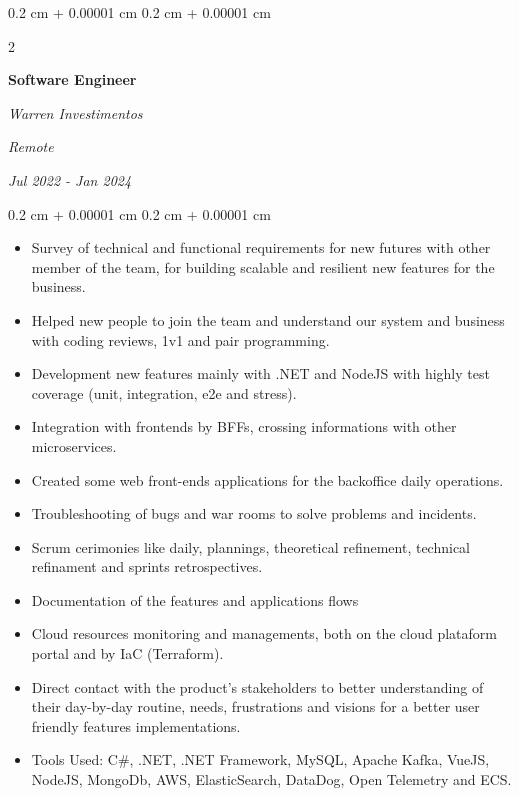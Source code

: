 \documentclass[10pt, letterpaper]{article}
\newenvironment{highlights}{
    \begin{itemize}[
        topsep=0.10 cm,
        parsep=0.10 cm,
        partopsep=0pt,
        itemsep=0pt,
        leftmargin=0.4 cm + 10pt
    ]
}{
    \end{itemize}
} %
\newenvironment{onecolentry}{
    \begin{adjustwidth}{
        0.2 cm + 0.00001 cm
    }{
        0.2 cm + 0.00001 cm
    }
}{
    \end{adjustwidth}
} %
\newenvironment{twocolentry}[2][]{
    \onecolentry
    \def\secondColumn{#2}
    \setcolumnwidth{\fill, 4.5 cm}
    \begin{paracol}{2}
}{
    \switchcolumn \raggedleft \secondColumn
    \end{paracol}
    \endonecolentry
} %
\begin{document}
        \begin{twocolentry}{
        \textit{Remote}    
            
        \textit{Jul 2022 - Jan 2024}}
            \textbf{Software Engineer}
            
            \textit{Warren Investimentos}
        \end{twocolentry}

        \vspace{0.10 cm}
        \begin{onecolentry}
            \begin{highlights}
                \item Survey of technical and functional requirements for new futures with other member of the team, for building scalable and resilient new features for the business.
                \item  Helped new people to join the team and understand our system and business with coding reviews, 1v1 and pair programming.
                \item Development new features mainly with .NET and NodeJS with highly test coverage (unit, integration, e2e and stress).
                \item Integration with frontends by BFFs, crossing informations with other microservices.
                \item Created some web front-ends applications for the backoffice daily operations.
                \item Troubleshooting of bugs and war rooms to solve problems and incidents.
                \item Scrum cerimonies like daily, plannings, theoretical refinement, technical refinament and sprints retrospectives.
                \item Documentation of the features and applications flows
                \item Cloud resources monitoring and managements, both on the cloud plataform portal and by IaC (Terraform).
                \item Direct contact with the product's stakeholders to better understanding of their day-by-day routine, needs, frustrations and visions for a better user friendly features implementations.
                \item Tools Used: C\#, .NET, .NET Framework, MySQL, Apache Kafka, VueJS, NodeJS, MongoDb, AWS, ElasticSearch, DataDog, Open Telemetry and ECS.
            \end{highlights}
        \end{onecolentry}
\end{document}
